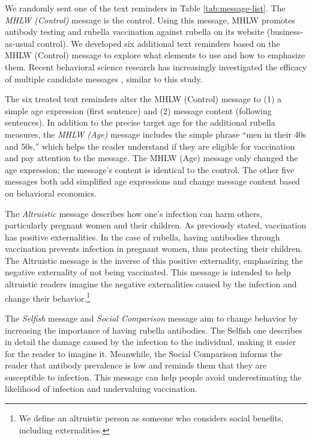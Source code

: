 \documentclass[
]{article}
\begin{document}
We randomly sent one of the text reminders in Table \ref{tab:message-list}. The \emph{MHLW (Control)} message is the control. Using this message, MHLW promotes antibody testing and rubella vaccination against rubella on its website (business-as-usual control). We developed six additional text reminders based on the MHLW (Control) message to explore what elements to use and how to emphasize them. Recent behavioral science research has increasingly investigated the efficacy of multiple candidate messages \citep[e.g.,][]{Dai2021, Milkman2021}, similar to this study.

The six treated text reminders alter the MHLW (Control) message to (1) a simple age expression (first sentence) and (2) message content (following sentences). In addition to the precise target age for the additional rubella measures, the \emph{MHLW (Age)} message includes the simple phrase ``men in their 40s and 50s,'' which helps the reader understand if they are eligible for vaccination and pay attention to the message. The MHLW (Age) message only changed the age expression; the message's content is identical to the control. The other five messages both add simplified age expressions and change message content based on behavioral economics.

The \emph{Altruistic} message describes how one's infection can harm others, particularly pregnant women and their children. As previously stated, vaccination has positive externalities. In the case of rubella, having antibodies through vaccination prevents infection in pregnant women, thus protecting their children. The Altruistic message is the inverse of this positive externality, emphasizing the negative externality of not being vaccinated. This message is intended to help altruistic readers imagine the negative externalities caused by the infection and change their behavior.\footnote{We define an altruistic person as someone who considers social benefits, including externalities.}

The \emph{Selfish} message and \emph{Social Comparison} message aim to change behavior by increasing the importance of having rubella antibodies. The Selfish one describes in detail the damage caused by the infection to the individual, making it easier for the reader to imagine it. Meanwhile, the Social Comparison informs the reader that antibody prevalence is low and reminds them that they are susceptible to infection. This message can help people avoid underestimating the likelihood of infection and undervaluing vaccination.
\end{document}
